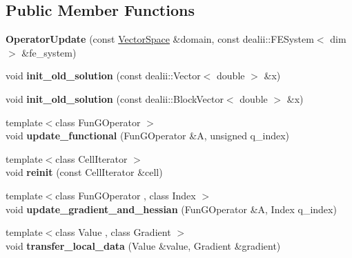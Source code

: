 \subsection*{\-Public \-Member \-Functions}
\begin{DoxyCompactItemize}
\item 
\hypertarget{structSpacy_1_1dealII_1_1Detail_1_1OperatorUpdate_a86e26a8d18f90341ca1f4d8e8575b7ca}{{\bfseries \-Operator\-Update} (const \hyperlink{classSpacy_1_1VectorSpace}{\-Vector\-Space} \&domain, const dealii\-::\-F\-E\-System$<$ dim $>$ \&fe\-\_\-system)}\label{structSpacy_1_1dealII_1_1Detail_1_1OperatorUpdate_a86e26a8d18f90341ca1f4d8e8575b7ca}

\item 
\hypertarget{structSpacy_1_1dealII_1_1Detail_1_1OperatorUpdate_afe0417057101640cf710d37af51919c1}{void {\bfseries init\-\_\-old\-\_\-solution} (const dealii\-::\-Vector$<$ double $>$ \&x)}\label{structSpacy_1_1dealII_1_1Detail_1_1OperatorUpdate_afe0417057101640cf710d37af51919c1}

\item 
\hypertarget{structSpacy_1_1dealII_1_1Detail_1_1OperatorUpdate_afb99cae3d19ffbe116d6e5870c158526}{void {\bfseries init\-\_\-old\-\_\-solution} (const dealii\-::\-Block\-Vector$<$ double $>$ \&x)}\label{structSpacy_1_1dealII_1_1Detail_1_1OperatorUpdate_afb99cae3d19ffbe116d6e5870c158526}

\item 
\hypertarget{structSpacy_1_1dealII_1_1Detail_1_1OperatorUpdate_a2874e188ef84099a662b61085a20ade4}{{\footnotesize template$<$class Fun\-G\-Operator $>$ }\\void {\bfseries update\-\_\-functional} (\-Fun\-G\-Operator \&\-A, unsigned q\-\_\-index)}\label{structSpacy_1_1dealII_1_1Detail_1_1OperatorUpdate_a2874e188ef84099a662b61085a20ade4}

\item 
\hypertarget{structSpacy_1_1dealII_1_1Detail_1_1OperatorUpdate_a1c4d36e22b606f7e74202ad052c9d2bb}{{\footnotesize template$<$class Cell\-Iterator $>$ }\\void {\bfseries reinit} (const \-Cell\-Iterator \&cell)}\label{structSpacy_1_1dealII_1_1Detail_1_1OperatorUpdate_a1c4d36e22b606f7e74202ad052c9d2bb}

\item 
\hypertarget{structSpacy_1_1dealII_1_1Detail_1_1OperatorUpdate_aada286dd436187271f832d8a771fba83}{{\footnotesize template$<$class Fun\-G\-Operator , class Index $>$ }\\void {\bfseries update\-\_\-gradient\-\_\-and\-\_\-hessian} (\-Fun\-G\-Operator \&\-A, \-Index q\-\_\-index)}\label{structSpacy_1_1dealII_1_1Detail_1_1OperatorUpdate_aada286dd436187271f832d8a771fba83}

\item 
\hypertarget{structSpacy_1_1dealII_1_1Detail_1_1OperatorUpdate_a4bc296edc42dff189df642b574df28c0}{{\footnotesize template$<$class Value , class Gradient $>$ }\\void {\bfseries transfer\-\_\-local\-\_\-data} (\-Value \&value, \-Gradient \&gradient)}\label{structSpacy_1_1dealII_1_1Detail_1_1OperatorUpdate_a4bc296edc42dff189df642b574df28c0}

\end{DoxyCompactItemize}
